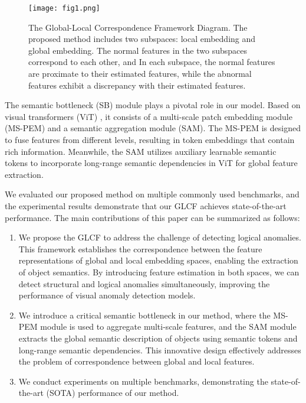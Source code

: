 \documentclass[lettersize,journal]{IEEEtran}
\begin{document}
\begin{figure}[t]\centering
\texttt{[image: fig1.png]}
\caption{The Global-Local Correspondence Framework Diagram. The proposed method includes two subspaces: local embedding and global embedding. The normal features in the two subspaces correspond to each other, and In each subspace, the normal features are proximate to their estimated features, while the abnormal features exhibit a discrepancy with their estimated features.}
\label{FIG2}
\end{figure}


The semantic bottleneck (SB) module plays a pivotal role in our model. Based on visual transformers (ViT) \cite{r29}, it consists of a multi-scale patch embedding module (MS-PEM) and a semantic aggregation module (SAM). The MS-PEM is designed to fuse features from different levels, resulting in token embeddings that contain rich information. Meanwhile, the SAM utilizes auxiliary learnable semantic tokens to incorporate long-range semantic dependencies in ViT for global feature extraction.

We evaluated our proposed method on multiple commonly used benchmarks, and the experimental results demonstrate that our GLCF achieves state-of-the-art performance. The main contributions of this paper can be summarized as follows:

\begin{enumerate}
\item We propose the GLCF to address the challenge of detecting logical anomalies. This framework establishes the correspondence between the feature representations of global and local embedding spaces, enabling the extraction of object semantics. By introducing feature estimation in both spaces, we can detect structural and logical anomalies simultaneously, improving the performance of visual anomaly detection models.

\item We introduce a critical semantic bottleneck in our method, where the MS-PEM module is used to aggregate multi-scale features, and the SAM module extracts the global semantic description of objects using semantic tokens and long-range semantic dependencies. This innovative design effectively addresses the problem of correspondence between global and local features.

\item We conduct experiments on multiple benchmarks, demonstrating the state-of-the-art (SOTA) performance of our method.
\end{enumerate}
\end{document}
